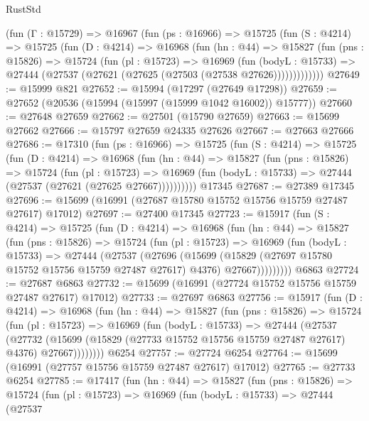 \begin{lexlean}{RustStd}
\begin{coremodule}
    (fun (Γ : @15729) =>
    @16967
      (fun (ps : @16966) =>
      @15725
        (fun (S : @4214) =>
        @15725
          (fun (D : @4214) =>
          @16968
            (fun (hn : @44) =>
            @15827
              (fun (pns : @15826) =>
              @15724
                (fun (pl : @15723) =>
                @16969
                  (fun (bodyL : @15733) =>
                  @27444 (@27537 (@27621 (@27625 (@27503 (@27538 @27626)))))))))))))
@27649 := @15999 @821
@27652 := @15994 (@17297 (@27649 @17298))
@27659 := @27652 (@20536 (@15994 (@15997 (@15999 @1042 @16002)) @15777))
@27660 := @27648 @27659
@27662 := @27501 (@15790 @27659)
@27663 := @15699 @27662
@27666 := @15797 @27659 @24335 @27626
@27667 := @27663 @27666
@27686 := @17310
    (fun (ps : @16966) =>
    @15725
      (fun (S : @4214) =>
      @15725
        (fun (D : @4214) =>
        @16968
          (fun (hn : @44) =>
          @15827
            (fun (pns : @15826) =>
            @15724
              (fun (pl : @15723) =>
              @16969 (fun (bodyL : @15733) => @27444 (@27537 (@27621 (@27625 @27667))))))))))
    @17345
@27687 := @27389 @17345
@27696 := @15699 (@16991 (@27687 @15780 @15752 @15756 @15759 @27487 @27617) @17012)
@27697 := @27400 @17345
@27723 := @15917
    (fun (S : @4214) =>
    @15725
      (fun (D : @4214) =>
      @16968
        (fun (hn : @44) =>
        @15827
          (fun (pns : @15826) =>
          @15724
            (fun (pl : @15723) =>
            @16969
              (fun (bodyL : @15733) =>
              @27444
                (@27537
                  (@27696
                    (@15699
                      (@15829 (@27697 @15780 @15752 @15756 @15759 @27487 @27617) @4376)
                      @27667)))))))))
    @6863
@27724 := @27687 @6863
@27732 := @15699 (@16991 (@27724 @15752 @15756 @15759 @27487 @27617) @17012)
@27733 := @27697 @6863
@27756 := @15917
    (fun (D : @4214) =>
    @16968
      (fun (hn : @44) =>
      @15827
        (fun (pns : @15826) =>
        @15724
          (fun (pl : @15723) =>
          @16969
            (fun (bodyL : @15733) =>
            @27444
              (@27537
                (@27732
                  (@15699 (@15829 (@27733 @15752 @15756 @15759 @27487 @27617) @4376) @27667))))))))
    @6254
@27757 := @27724 @6254
@27764 := @15699 (@16991 (@27757 @15756 @15759 @27487 @27617) @17012)
@27765 := @27733 @6254
@27785 := @17417
    (fun (hn : @44) =>
    @15827
      (fun (pns : @15826) =>
      @15724
        (fun (pl : @15723) =>
        @16969
          (fun (bodyL : @15733) =>
          @27444
            (@27537

\end{coremodule}
\end{lexlean}
